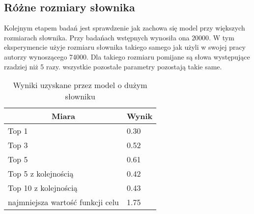 \subsection{Różne rozmiary słownika}
Kolejnym etapem badań jest sprawdzenie jak zachowa się model przy większych rozmiarach słownika. Przy badańach wstępnych 
wynosiła ona \begin{math}20000\end{math}. W tym eksperymencie użyje rozmiaru słownika takiego samego jak użyli w 
swojej pracy autorzy \cite{hellendoorn} wynoszącego 74000. Dla takiego rozmiaru pomijane są słowa 
występujące rzadziej niż 5 razy. wszystkie pozostałe parametry pozostają takie same.
\begin{table}[ht]
    \centering
    \begin{tabular}{|l|l|}
        \hline
        \multicolumn{1}{|c|}{Miara}  & Wynik\\ \hline
        Top 1                            & 0.30 \\ \hline
        Top 3                            & 0.52 \\ \hline
        Top 5                            & 0.61 \\ \hline
        Top 5 z kolejnością              & 0.42 \\ \hline
        Top 10 z kolejnością             & 0.43 \\ \hline
        najmniejsza wartość funkcji celu & 1.75 \\ \hline
        \end{tabular}
    \caption{Wyniki uzyskane przez model o dużym słowniku} 
    \label{wyniki_duzego}

\end{table} \\ 

